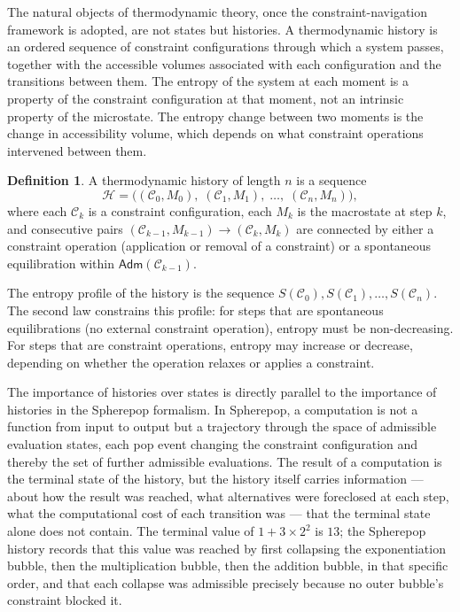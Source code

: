 \documentclass[12pt,openany]{book}
\theoremstyle{plain}
\theoremstyle{definition}
\newtheorem{definition}[theorem]{Definition}
\theoremstyle{remark}
\newcommand{\sadm}{\mathsf{Adm}}
\newcommand{\shist}{\mathcal{H}}
\begin{document}
The natural objects of thermodynamic theory, once the constraint-navigation framework is adopted, are not states but histories. A thermodynamic history is an ordered sequence of constraint configurations through which a system passes, together with the accessible volumes associated with each configuration and the transitions between them. The entropy of the system at each moment is a property of the constraint configuration at that moment, not an intrinsic property of the microstate. The entropy change between two moments is the change in accessibility volume, which depends on what constraint operations intervened between them.

\begin{definition}
A thermodynamic history of length $n$ is a sequence
\[
  \shist = \bigl( (\mathcal{C}_0, M_0),\; (\mathcal{C}_1, M_1),\; \ldots,\; (\mathcal{C}_n, M_n) \bigr),
\]
where each $\mathcal{C}_k$ is a constraint configuration, each $M_k$ is the macrostate at step $k$, and consecutive pairs $(\mathcal{C}_{k-1}, M_{k-1}) \to (\mathcal{C}_k, M_k)$ are connected by either a constraint operation (application or removal of a constraint) or a spontaneous equilibration within $\sadm(\mathcal{C}_{k-1})$.
\end{definition}

The entropy profile of the history is the sequence $S(\mathcal{C}_0), S(\mathcal{C}_1), \ldots, S(\mathcal{C}_n)$. The second law constrains this profile: for steps that are spontaneous equilibrations (no external constraint operation), entropy must be non-decreasing. For steps that are constraint operations, entropy may increase or decrease, depending on whether the operation relaxes or applies a constraint.

The importance of histories over states is directly parallel to the importance of histories in the Spherepop formalism. In Spherepop, a computation is not a function from input to output but a trajectory through the space of admissible evaluation states, each pop event changing the constraint configuration and thereby the set of further admissible evaluations. The result of a computation is the terminal state of the history, but the history itself carries information — about how the result was reached, what alternatives were foreclosed at each step, what the computational cost of each transition was — that the terminal state alone does not contain. The terminal value of $1 + 3 \times 2^2$ is $13$; the Spherepop history records that this value was reached by first collapsing the exponentiation bubble, then the multiplication bubble, then the addition bubble, in that specific order, and that each collapse was admissible precisely because no outer bubble's constraint blocked it.
\end{document}
